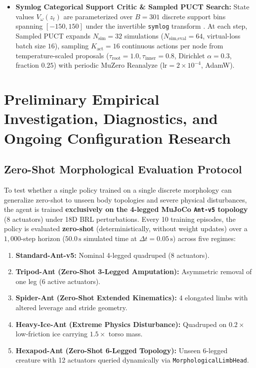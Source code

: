 \documentclass[11pt,a4paper]{article}
\begin{document}
\begin{itemize}
    \item \textbf{Symlog Categorical Support Critic \& Sampled PUCT Search:} State values $V_\omega(z_t)$ are parameterized over $B = 301$ discrete support bins spanning $[-150, 150]$ under the invertible \texttt{symlog} transform \cite{hafner2023mastering,hansen2024tdmpc2}. At each step, Sampled PUCT \cite{hubert2021learning} expands $N_{\text{sim}} = 32$ simulations ($N_{\text{sim,eval}} = 64$, virtual-loss batch size $16$), sampling $K_{\text{act}} = 16$ continuous actions per node from temperature-scaled proposals ($\tau_{\text{root}} = 1.0, \tau_{\text{inner}} = 0.8$, Dirichlet $\alpha = 0.3$, fraction $0.25$) with periodic MuZero Reanalyze ($\text{lr} = 2 \times 10^{-4}$, AdamW).
\end{itemize}

\section{Preliminary Empirical Investigation, Diagnostics, and Ongoing Configuration Research}
\label{sec:experiments}

\subsection{Zero-Shot Morphological Evaluation Protocol}
To test whether a single policy trained on a single discrete morphology can generalize zero-shot to unseen body topologies and severe physical disturbances, the agent is trained \textbf{exclusively on the 4-legged MuJoCo \texttt{Ant-v5} topology} (8 actuators) under 18D BRL perturbations. Every 10 training episodes, the policy is evaluated \textbf{zero-shot} (deterministically, without weight updates) over a $1,000$-step horizon ($50.0\,\text{s}$ simulated time at $\Delta t = 0.05\,\text{s}$) across five regimes:
\begin{enumerate}[itemsep=1pt,topsep=3pt]
    \item \textbf{Standard-Ant-v5:} Nominal 4-legged quadruped (8 actuators).
    \item \textbf{Tripod-Ant (Zero-Shot 3-Legged Amputation):} Asymmetric removal of one leg (6 active actuators).
    \item \textbf{Spider-Ant (Zero-Shot Extended Kinematics):} 4 elongated limbs with altered leverage and stride geometry.
    \item \textbf{Heavy-Ice-Ant (Extreme Physics Disturbance):} Quadruped on $0.2\times$ low-friction ice carrying $1.5\times$ torso mass.
    \item \textbf{Hexapod-Ant (Zero-Shot 6-Legged Topology):} Unseen 6-legged creature with 12 actuators queried dynamically via \texttt{MorphologicalLimbHead}.
\end{enumerate}
\end{document}
